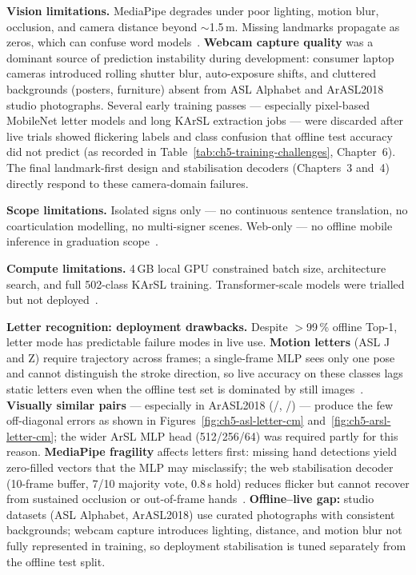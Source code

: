 \noindent\textbf{Vision limitations.} MediaPipe degrades under poor lighting, motion blur, occlusion, and camera distance beyond $\sim$1.5\,m. Missing landmarks propagate as zeros, which can confuse word models~\cite{zhang2020mediapipe,mediapipeweb}. \textbf{Webcam capture quality} was a dominant source of prediction instability during development: consumer laptop cameras introduced rolling shutter blur, auto-exposure shifts, and cluttered backgrounds (posters, furniture) absent from ASL Alphabet and ArASL2018 studio photographs. Several early training passes --- especially pixel-based MobileNet letter models and long KArSL extraction jobs --- were discarded after live trials showed flickering labels and class confusion that offline test accuracy did not predict (as recorded in Table~\ref{tab:ch5-training-challenges}, Chapter~6). The final landmark-first design and stabilisation decoders (Chapters~3 and~4) directly respond to these camera-domain failures.\par\vspace{0.2cm}

\noindent\textbf{Scope limitations.} Isolated signs only --- no continuous sentence translation, no coarticulation modelling, no multi-signer scenes. Web-only --- no offline mobile inference in graduation scope~\cite{duarte2021how2sign}.\par\vspace{0.2cm}

\noindent\textbf{Compute limitations.} 4\,GB local GPU constrained batch size, architecture search, and full 502-class KArSL training. Transformer-scale models were trialled but not deployed~\cite{vaswani2017attention}.\par\vspace{0.2cm}

\noindent\textbf{Letter recognition: deployment drawbacks.} Despite $>$99\,\% offline Top-1, letter mode has predictable failure modes in live use. \textbf{Motion letters} (ASL J and Z) require trajectory across frames; a single-frame MLP sees only one pose and cannot distinguish the stroke direction, so live accuracy on these classes lags static letters even when the offline test set is dominated by still images~\cite{akash2019aslalphabet}. \textbf{Visually similar pairs} --- especially in ArASL2018 (/, /) --- produce the few off-diagonal errors as shown in Figures~\ref{fig:ch5-asl-letter-cm} and~\ref{fig:ch5-arsl-letter-cm}; the wider ArSL MLP head (512/256/64) was required partly for this reason. \textbf{MediaPipe fragility} affects letters first: missing hand detections yield zero-filled vectors that the MLP may misclassify; the web stabilisation decoder (10-frame buffer, 7/10 majority vote, 0.8\,s hold) reduces flicker but cannot recover from sustained occlusion or out-of-frame hands~\cite{zhang2020mediapipe,mediapipeweb}. \textbf{Offline--live gap:} studio datasets (ASL Alphabet, ArASL2018) use curated photographs with consistent backgrounds; webcam capture introduces lighting, distance, and motion blur not fully represented in training, so deployment stabilisation is tuned separately from the offline test split.\par\vspace{0.2cm}

